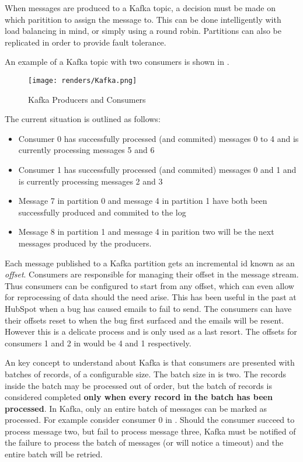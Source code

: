 When messages are produced to a Kafka topic, a decision must be made on which paritition to assign the message to. This can be done intelligently with load balancing in mind, or simply using a round robin. Partitions can also be replicated in order to provide fault tolerance.

An example of a Kafka topic with two consumers is shown in . 

\begin{figure}[H]
      \centering
      \texttt{[image: renders/Kafka.png]}
      \caption{Kafka Producers and Consumers}
      \label{fig:kafka}
\end{figure}  

The current situation is outlined as follows:
\begin{itemize}
\item{Consumer 0 has successfully processed (and commited) messages 0 to 4 and is currently processing messages 5 and 6}
\item{Consumer 1 has successfully processed (and commited) messages 0 and 1 and is currently processing messages 2 and 3}
\item{Message 7 in partition 0 and message 4 in partition 1 have both been successfully produced and commited to the log}
\item{Message 8 in partition 1 and message 4 in parition two will be the next messages produced by the producers.}
\end{itemize}

Each message published to a Kafka partition gets an incremental id known as an \textit{offset}. Consumers are responsible for managing their offset in the message stream. Thus consumers can be configured to start from any offset, which can even allow for reprocessing of data should the need arise. This has been useful in the past at HubSpot when a bug has caused emails to fail to send. The consumers can have their offsets reset to when the bug first surfaced and the emails will be resent. However this is a delicate process and is only used as a last resort. The offsets for consumers 1 and 2 in  would be 4 and 1 respectively.

An key concept to understand about Kafka is that consumers are presented with batches of records, of a configurable size. The batch size in  is two. The records inside the batch may be processed out of order, but the batch of records is considered completed \textbf{only when every record in the batch has been processed}. In Kafka, only an entire batch of messages can be marked as processed. For example consider consumer 0 in . Should the consumer succeed to process message two, but fail to process message three, Kafka must be notified of the failure to process the batch of messages (or will notice a timeout) and the entire batch will be retried.


